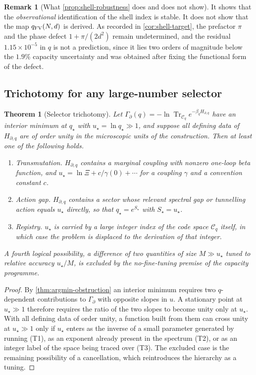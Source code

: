 \documentclass[aps,prd,reprint,nofootinbib,superscriptaddress,floatfix]{revtex4-2}
\numberwithin{equation}{section}
\theoremstyle{definition}
\newtheorem{remark}{Remark}[section]
\theoremstyle{plain}
\newtheorem{theorem}{Theorem}[section]
\begin{document}
\begin{remark}[What \cref{prop:shell-robustness} does and does not show]
It shows that the \emph{observational} identification of the shell index is
stable.  It does not show that the map \(q_{\rm FV}(N,d)\) is derived.  As
recorded in \cref{cor:shell-target}, the prefactor \(\pi\) and the phase
defect \(1+\pi/(2d^2)\) remain undetermined, and the residual
\(1.15\times10^{-5}\) in \(q\) is not a prediction, since it lies two orders
of magnitude below the \(1.9\%\) capacity uncertainty and was obtained after
fixing the functional form of the defect.
\end{remark}

\subsection{Trichotomy for any large-number selector}

\begin{theorem}[Selector trichotomy]
\label{thm:selector-trichotomy}
Let \(\Gamma_\partial(q)=-\ln\operatorname{Tr}_{\mathcal C_q}
e^{-\beta_qH_{\partial,q}}\) have an interior minimum at \(q_\star\) with
\(u_\star=\ln q_\star\gg1\), and suppose all defining data of
\(H_{\partial,q}\) are of order unity in the microscopic units of the
construction.  Then at least one of the following holds.
\begin{enumerate}
\item[(T1)] \emph{Transmutation.}  \(H_{\partial,q}\) contains a marginal
coupling with nonzero one-loop beta function, and
\(u_\star=\ln\Xi+c/\gamma(0)+\cdots\) for a coupling \(\gamma\) and a
convention constant \(c\).
\item[(T2)] \emph{Action gap.}  \(H_{\partial,q}\) contains a sector whose
relevant spectral gap or tunnelling action equals \(u_\star\) directly, so
that \(q_\star=e^{S_\star}\) with \(S_\star=u_\star\).
\item[(T3)] \emph{Registry.}  \(u_\star\) is carried by a large integer index
of the code space \(\mathcal C_q\) itself, in which case the problem is
displaced to the derivation of that integer.
\end{enumerate}
A fourth logical possibility, a difference of two quantities of size
\(M\gg u_\star\) tuned to relative accuracy \(u_\star/M\), is excluded by the
no-fine-tuning premise of the capacity programme.
\end{theorem}

\begin{proof}
By \cref{thm:argmin-obstruction} an interior minimum requires two
\(q\)-dependent contributions to \(\Gamma_\partial\) with opposite slopes in
\(u\).  A stationary point at \(u_\star\gg1\) therefore requires the ratio of
the two slopes to become unity only at \(u_\star\).  With all defining data
of order unity, a function built from them can cross unity at
\(u_\star\gg1\) only if \(u_\star\) enters as the inverse of a small
parameter generated by running (T1), as an exponent already present in the
spectrum (T2), or as an integer label of the space being traced over (T3).
The excluded case is the remaining possibility of a cancellation, which
reintroduces the hierarchy as a tuning.
\end{proof}
\end{document}
